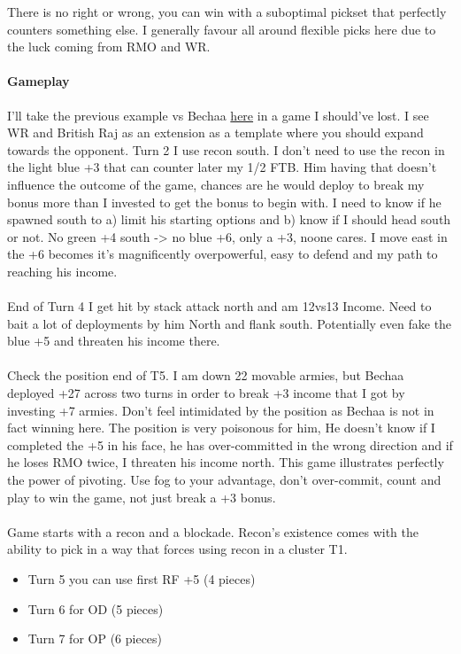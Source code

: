 There is no right or wrong, you can win with a suboptimal pickset that perfectly counters something else. I generally favour all around flexible picks here due to the luck coming from RMO and WR.

\paragraph{Gameplay}

I'll take the previous example vs Bechaa \href{https://www.warzone.com/MultiPlayer?GameID=40619051}{here} in a game I should've lost. I see WR and British Raj as an extension as a template where you should expand towards the opponent. Turn 2 I use recon south. I don't need to use the recon in the light blue +3 that can counter later my 1/2 FTB. Him having that doesn't influence the outcome of the game, chances are he would deploy to break my bonus more than I invested to get the bonus to begin with. I need to know if he spawned south to a) limit his starting options and b) know if I should head south or not. No green +4 south -> no blue +6, only a +3, noone cares. I move east in the +6 becomes it's magnificently overpowerful, easy to defend and my path to reaching his income.
\\
\\
End of Turn 4 I get hit by stack attack north and am 12vs13 Income. Need to bait a lot of deployments by him North and flank south. Potentially even fake the blue +5 and threaten his income there.
\\
\\
Check the position end of T5. I am down 22 movable armies, but Bechaa deployed +27 across two turns in order to break +3 income that I got by investing +7 armies. Don't feel intimidated by the position as Bechaa is not in fact winning here. The position is very poisonous for him, He doesn't know if I completed the +5 in his face, he has over-committed in the wrong direction and if he loses RMO twice, I threaten his income north. This game illustrates perfectly the power of pivoting. Use fog to your advantage, don't over-commit, count and play to win the game, not just break a +3 bonus.
\\
\\
Game starts with a recon and a blockade. Recon's existence comes with the ability to pick in a way that forces using recon in a cluster T1. 
\begin{itemize}
    \item Turn 5 you can use first RF +5 (4 pieces)
    \item Turn 6 for OD (5 pieces)
    \item Turn 7 for OP (6 pieces)
\end{itemize}

